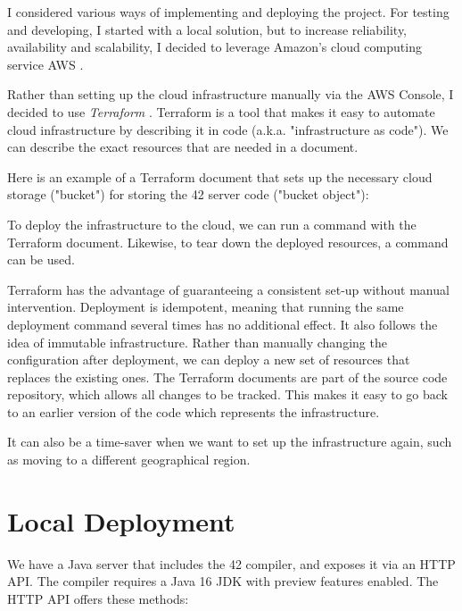 
I considered various ways of implementing and deploying the project. For testing and developing, I started with a local solution, but to increase reliability, availability and scalability, I decided to leverage Amazon's cloud computing service AWS \cite{amazon-2022A}.

Rather than setting up the cloud infrastructure manually via the AWS Console, I decided to use \emph{Terraform} \cite{hashicorp-2022}. Terraform is a tool that makes it easy to automate cloud infrastructure by describing it in code (a.k.a. "infrastructure as code"). We can describe the exact resources that are needed in a document.

Here is an example of a Terraform document that sets up the necessary cloud storage ("bucket") for storing the 42 server code ("bucket object"):


To deploy the infrastructure to the cloud, we can run a  command with the Terraform document. Likewise, to tear down the deployed resources, a  command can be used.

Terraform has the advantage of guaranteeing a consistent set-up without manual intervention. Deployment is idempotent, meaning that running the same deployment command several times has no additional effect. It also follows the idea of immutable infrastructure. Rather than manually changing the configuration after deployment, we can deploy a new set of resources that replaces the existing ones. The Terraform documents are part of the source code repository, which allows all changes to be tracked. This makes it easy to go back to an earlier version of the code which represents the infrastructure.

It can also be a time-saver when we want to set up the infrastructure again, such as moving to a different geographical region.

\section{Local Deployment}

We have a Java server that includes the 42 compiler, and exposes it via an HTTP API. The compiler requires a Java 16 JDK with preview features enabled. The HTTP API offers these methods:

